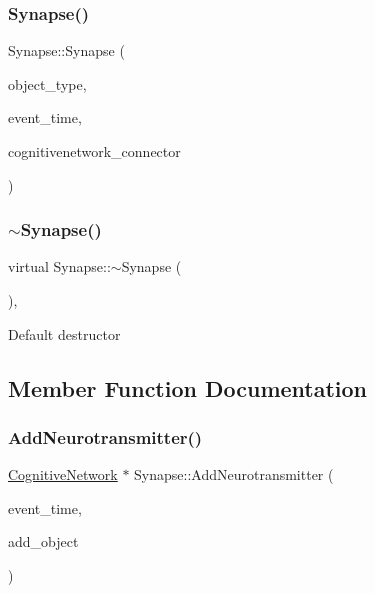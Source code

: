 \mbox{\label{classSynapse_ab651f847b74235df5121fe42faf3f253}} 
\subsubsection{\texorpdfstring{Synapse()}{Synapse()}\hspace{0.1cm}{\footnotesize\ttfamily [4/4]}}
{\footnotesize\ttfamily Synapse\+::\+Synapse (\begin{DoxyParamCaption}\item[{unsigned int}]{object\+\_\+type,  }\item[{std\+::chrono\+::time\+\_\+point$<$ \mbox{\hyperlink{universe_8h_a0ef8d951d1ca5ab3cfaf7ab4c7a6fd80}{Clock}} $>$}]{event\+\_\+time,  }\item[{\mbox{\hyperlink{classCognitiveNetwork}{Cognitive\+Network}} \&}]{cognitivenetwork\+\_\+connector }\end{DoxyParamCaption})\hspace{0.3cm}{\ttfamily [inline]}}

\mbox{\label{classSynapse_a882bfd0fbb2aead46c1410ab310920e5}} 
\subsubsection{\texorpdfstring{$\sim$\+Synapse()}{~Synapse()}}
{\footnotesize\ttfamily virtual Synapse\+::$\sim$\+Synapse (\begin{DoxyParamCaption}{ }\end{DoxyParamCaption})\hspace{0.3cm}{\ttfamily [inline]}, {\ttfamily [virtual]}}

Default destructor 

\subsection{Member Function Documentation}
\mbox{\label{classSynapse_a76b96e3f71f9e7b0ba6b80166c3883f7}} 
\subsubsection{\texorpdfstring{Add\+Neurotransmitter()}{AddNeurotransmitter()}}
{\footnotesize\ttfamily \mbox{\hyperlink{classCognitiveNetwork}{Cognitive\+Network}} $\ast$ Synapse\+::\+Add\+Neurotransmitter (\begin{DoxyParamCaption}\item[{std\+::chrono\+::time\+\_\+point$<$ \mbox{\hyperlink{universe_8h_a0ef8d951d1ca5ab3cfaf7ab4c7a6fd80}{Clock}} $>$}]{event\+\_\+time,  }\item[{\mbox{\hyperlink{classCognitiveNetwork}{Cognitive\+Network}} $\ast$}]{add\+\_\+object }\end{DoxyParamCaption})}

